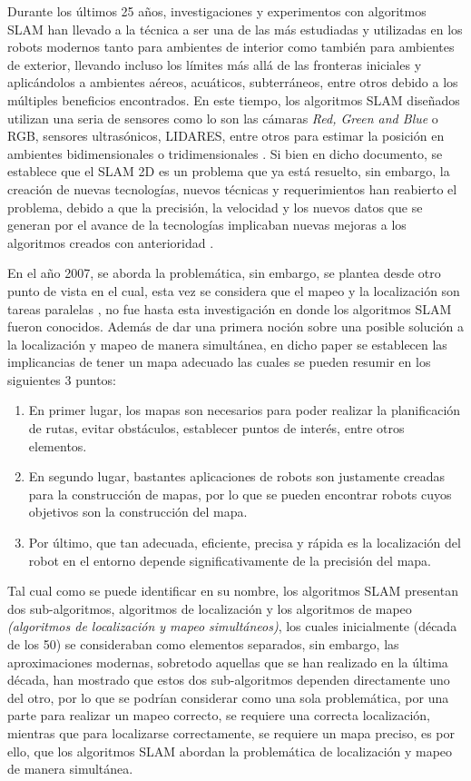 Durante los últimos 25 años, investigaciones y experimentos con algoritmos SLAM han llevado a la técnica a ser una de las más estudiadas y utilizadas en los robots modernos tanto para ambientes de interior como también para ambientes de exterior, llevando incluso los límites más allá de las fronteras iniciales y aplicándolos a ambientes aéreos, acuáticos, subterráneos, entre otros debido a los múltiples beneficios encontrados. En este tiempo, los algoritmos SLAM diseñados utilizan una seria de sensores como lo son las cámaras \textit{Red, Green and Blue} o RGB, sensores ultrasónicos, LIDARES, entre otros para estimar la posición en ambientes bidimensionales o tridimensionales \cite{li_topology_2016}. Si bien en dicho documento, se establece que el SLAM 2D es un problema que ya está resuelto, sin embargo, la creación de nuevas tecnologías, nuevos técnicas y requerimientos han reabierto el problema, debido a que la precisión, la velocidad y los nuevos datos que se generan por el avance de la tecnologías implicaban nuevas mejoras a los algoritmos creados con anterioridad \cite{taheri_slam_2021}.

En el año 2007, se aborda la problemática, sin embargo, se plantea desde otro punto de vista en el cual, esta vez se considera que el mapeo y la localización son tareas paralelas \cite{klein_parallel_2007}, no fue hasta esta investigación en donde los algoritmos SLAM fueron conocidos. Además de dar una primera noción sobre una posible solución a la localización y mapeo de manera simultánea, en dicho paper se establecen las implicancias de tener un mapa adecuado las cuales se pueden resumir en los siguientes 3 puntos:
\begin{enumerate}
    \item En primer lugar, los mapas son necesarios para poder realizar la planificación de rutas, evitar obstáculos, establecer puntos de interés, entre otros elementos. 
    \item En segundo lugar, bastantes aplicaciones de robots son justamente creadas para la construcción de mapas, por lo que se pueden encontrar robots cuyos objetivos son la construcción del mapa.
    \item Por último, que tan adecuada, eficiente, precisa y rápida es la localización del robot en el entorno depende significativamente de la precisión del mapa.
\end{enumerate}

Tal cual como se puede identificar en su nombre, los algoritmos SLAM presentan dos sub-algoritmos, algoritmos de localización y los algoritmos de mapeo \textit{(algoritmos de localización y mapeo simultáneos)}, los cuales inicialmente (década de los 50) se consideraban como elementos separados, sin embargo, las aproximaciones modernas, sobretodo aquellas que se han realizado en la última década, han mostrado que estos dos sub-algoritmos dependen directamente uno del otro, por lo que se podrían considerar como una sola problemática, por una parte para realizar un mapeo correcto, se requiere una correcta localización, mientras que para localizarse correctamente, se requiere un mapa preciso, es por ello, que los algoritmos SLAM abordan la problemática de localización y mapeo de manera simultánea. 

